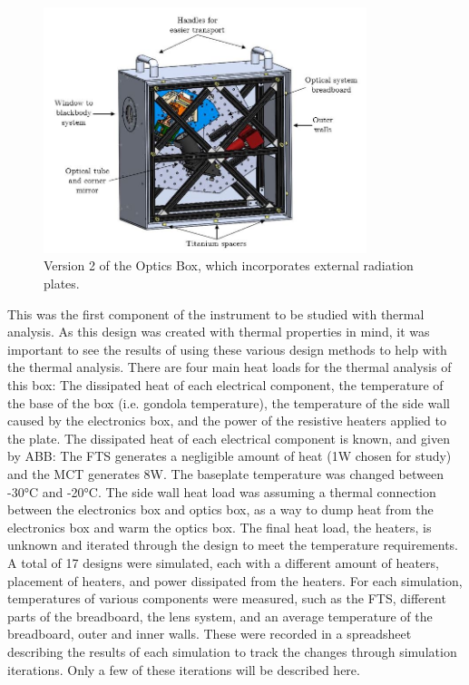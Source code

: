 \begin{figure}
    \centering
    \includegraphics[width=0.84\textwidth]{chap3_images/LIFE_V2_images/Optics_Box_V1_labelled.JPG}
    \caption{Version 2 of the Optics Box, which incorporates external radiation plates.}
    \label{fig:OB_V2}
\end{figure}

This was the first component of the instrument to be studied with thermal analysis. As this design was created with thermal properties in mind, it was important to see the results of using these various design methods to help with the thermal analysis. There are four main heat loads for the thermal analysis of this box: The dissipated heat of each electrical component, the temperature of the base of the box (i.e. gondola temperature), the temperature of the side wall caused by the electronics box, and the power of the resistive heaters applied to the plate. The dissipated heat of each electrical component is known, and given by ABB: The FTS generates a negligible amount of heat (1W chosen for study) and the MCT generates 8W. The baseplate temperature was changed between -30°C and -20°C. The side wall heat load was assuming a thermal connection between the electronics box and optics box, as a way to dump heat from the electronics box and warm the optics box. The final heat load, the heaters, is unknown and iterated through the design to meet the temperature requirements. A total of 17 designs were simulated, each with a different amount of heaters, placement of heaters, and power dissipated from the heaters. For each simulation, temperatures of various components were measured, such as the FTS, different parts of the breadboard, the lens system, and an average temperature of the breadboard, outer and inner walls. These were recorded in a spreadsheet describing the results of each simulation to track the changes through simulation iterations. Only a few of these iterations will be described here.

